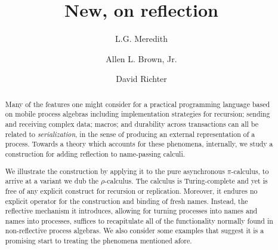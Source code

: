 \documentclass[]{amsart}
\theoremstyle{definition}
\theoremstyle{remark}
\numberwithin{equation}{subsection}
\newcommand{\pic}{$\pi$-calculus}
\newcommand{\rhoc}{$\rho$-calculus}
\newcommand{\papertitle}{New, on reflection}
\begin{document}
\setlength{\topmargin}{0in}
\setlength{\textheight}{8.5in}
\setlength{\parskip}{6pt}

\title{\huge{\papertitle}}

\author{ L.G. Meredith }

\author{ Allen L. Brown, Jr. }

\author{ David Richter }







\dedicatory{}



\begin{abstract}
\normalsize{ 

Many of the features one might consider for a practical programming
language based on mobile process algebras
\cite{MilnerPi}\cite{SangiorgiWalker} including implementation
strategies for recursion; sending and receiving complex data; macros;
and durability across transactions can all be related to
\textit{serialization}, in the sense of producing an external
representation of a process. Towards a theory which accounts for these
phenomena, internally, we study a construction for adding reflection
to name-passing calculi.

We illustrate the construction by applying it to the pure asynchronous
{\pic}, to arrive at a variant we dub the {\rhoc}. The calculus is
Turing-complete and yet is free of any explicit construct for
recursion or replication. Moreover, it endures no explicit operator
for the construction and binding of fresh names. Instead, the
reflective mechanism it introduces, allowing for turning processes
into names and names into processes, suffices to recapitulate all of
the functionality normally found in non-reflective process algebras.
We also consider some examples that suggest it is a promising start to
treating the phenomena mentioned afore.

}

\end{abstract}
\end{document}
